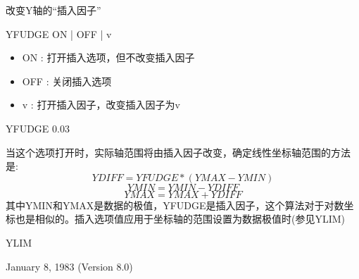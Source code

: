 \label{cmd:yfudge}

改变Y轴的``插入因子''

YFUDGE ON | OFF | v

\begin{itemize}
\item ON : 打开插入选项，但不改变插入因子 
\item OFF : 关闭插入选项 
\item v : 打开插入因子，改变插入因子为v 
\end{itemize}

YFUDGE 0.03

当这个选项打开时，实际轴范围将由插入因子改变，确定线性坐标轴范围的方法是:
\[ YDIFF=YFUDGE*(YMAX-YMIN) \]
\[ YMIN=YMIN-YDIFF \]
\[ YMAX=YMAX+YDIFF \]
其中YMIN和YMAX是数据的极值，YFUDGE是插入因子，这个算法对于对数坐标也是相似的。插入选项值应用于坐标轴的范围设置为数据极值时(参见YLIM)

YLIM

January 8, 1983 (Version 8.0)
